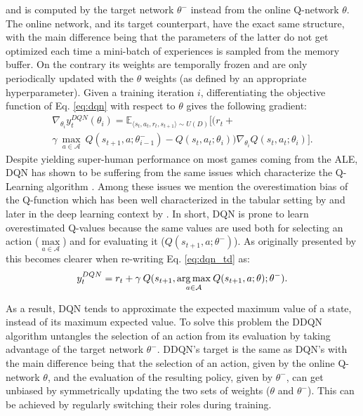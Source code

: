 and is computed by the target network $\theta^{-}$ instead from the online Q-network $\theta$. 
The online network, and its target counterpart, have the exact same structure, with the main difference being that the parameters of the latter do not get optimized each time a mini-batch of experiences is sampled from the memory buffer. On the contrary its weights are temporally frozen and are only periodically updated with the $\theta$ weights (as defined by an appropriate hyperparameter). Given a training iteration $i$, differentiating the objective function of Eq. \ref{eq:dqn} with respect to $\theta$ gives the following gradient: 
\begin{multline}
\nabla_{\theta_{i}}y^{DQN}_{t}(\theta_{i}) = \mathds{E}_{\langle s_{t},a_{t},r_{t},s_{t+1}\rangle\sim U(D)} \bigg[\big(r_{t} + \\ \gamma \: \underset{a\in \mathcal{A}}{\max}\: Q(s_{t+1}, a; \theta^{-}_{i-1})  - Q(s_{t}, a_{t}; \theta_{i})\big)\nabla_{\theta_{i}} Q(s_{t}, a_{t}; \theta_{i})\bigg].
\label{eq:dqn_gradient}
\end{multline}
Despite yielding super-human performance on most games coming from the ALE, DQN has shown to be suffering from the same issues which characterize the Q-Learning algorithm \cite{hasselt2010double}. Among these issues we mention the overestimation bias of the Q-function which has been well characterized in the tabular setting by \citet{hasselt2010double} and later in the deep learning context by \citet{van2016deep}.
In short, DQN is prone to learn overestimated Q-values because the same values are used both for selecting an action ($\underset{a\in \mathcal{A}}{\max}$) and for evaluating it ($Q(s_{t+1},a;\theta^{-})$). As originally presented by \citet{van2016deep} this becomes clearer when re-writing Eq. \ref{eq:dqn_td} as:
\begin{equation}
    y^{DQN}_{t} = r_{t} + \gamma \: Q(s_{t+1}, \underset{a\in \mathcal{A}}{\operatorname*{arg\,max}}\: Q(s_{t+1}, a; \theta); \theta^{-}). 
\end{equation}{}

As a result, DQN tends to approximate the expected maximum value of a state, instead of its maximum expected value. To solve this problem the DDQN algorithm untangles the selection of an action from its evaluation by taking advantage of the target network $\theta^{-}$. DDQN's target is the same as DQN's with the main difference being that the selection of an action, given by the online Q-network $\theta$, and the evaluation of the resulting policy, given by $\theta^{-}$, can get unbiased by symmetrically updating the two sets of weights ($\theta$ and $\theta^{-}$). This can be achieved by regularly switching their roles during training.


